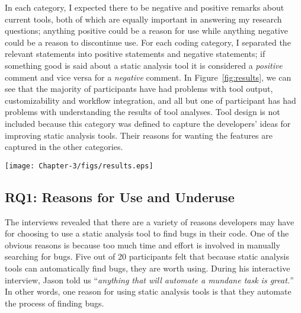 In each category, I expected there to be negative and positive remarks about
current tools, both of which are equally important in answering my research
questions; anything positive could be a reason for use while anything negative
could be a reason to discontinue use.
For each coding category, I separated the relevant statements into positive
statements and negative statements; if something good is said about a static
analysis tool it is considered a \emph{positive} comment and vice versa for a
\emph{negative} comment. In Figure~\ref{fig:results}, we can see that the
majority of participants have had problems with tool output, customizability
and workflow integration, and all but one of participant has had problems
with understanding the results of tool analyses. Tool design is not included because this category
was defined to capture the developers' ideas for improving static analysis
tools. Their reasons for wanting the features are captured in the other
categories.

\begin{figure*}
\centering
\texttt{[image: Chapter-3/figs/results.eps]}
\caption{The number of participants in each category expressing the good and the bad about static analysis tools they have used.}
\label{fig:results}
\end{figure*}

\subsection{RQ1: Reasons for Use and Underuse}
\label{subsec:rq1}

The interviews revealed that there are a variety of reasons developers may have
for choosing to use a static analysis tool to find bugs in their code. One of
the obvious reasons is because too much time and effort is involved in manually
searching for bugs. Five out of 20 participants felt that because static
analysis tools can automatically find bugs, they are worth using. During his
interactive interview, Jason told us ``\emph{anything that will automate a
mundane task is great.}'' In other words, one reason for using static analysis
tools is that they automate the process of finding bugs.

